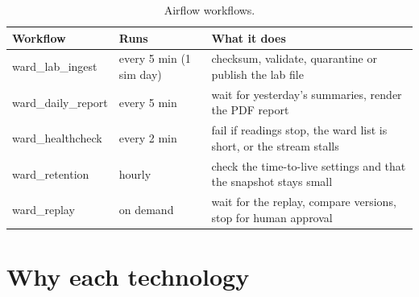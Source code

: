 \documentclass[11pt,a4paper]{article}
\begin{document}
\begin{table}[H]\centering\small
\begin{tabularx}{\linewidth}{|l|l|X|}
\hline
\rowcolor{tablehead}\textbf{Workflow} & \textbf{Runs} & \textbf{What it does} \\ \hline
ward\_lab\_ingest & every 5 min (1 sim day) & checksum, validate, quarantine or publish the lab file \\ \hline
ward\_daily\_report & every 5 min & wait for yesterday's summaries, render the PDF report \\ \hline
ward\_healthcheck & every 2 min & fail if readings stop, the ward list is short, or the stream stalls \\ \hline
ward\_retention & hourly & check the time-to-live settings and that the snapshot stays small \\ \hline
ward\_replay & on demand & wait for the replay, compare versions, stop for human approval \\ \hline
\end{tabularx}
\caption{Airflow workflows.}\label{tab:dags}
\end{table}

\section{Why each technology}
\end{document}
